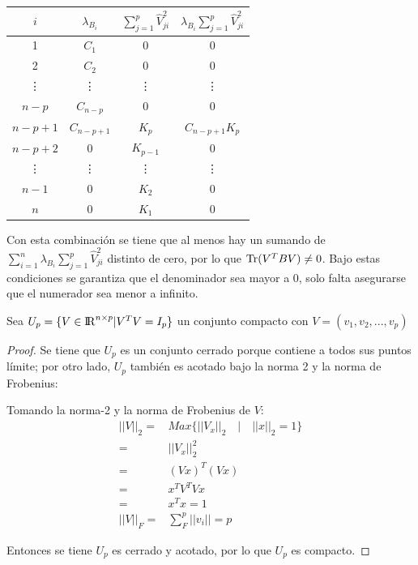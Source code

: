 \begin{center}
\begin{tabular}{ | c | c|  c | c|} 
\hline
$i$ & $\lambda_{B_i}$ & $\sum \limits_{j=1}^{p} \widehat{V}_{ji}^2$  & $\lambda_{B_i} \sum \limits_{j=1}^{p} \widehat{V}_{ji}^2$ \\ 
\hline
\hline
1 & $C_1$ & $0$ & $0$ \\ 
\hline
2 & $C_2$ & $0$ & $0$ \\ 
\hline
\vdots & \vdots & \vdots & \vdots \\ 
\hline
$n-p$ & $C_{n-p}$ & $0$ &  $0$\\ 
\hline
$n-p+1$ & $C_{n-p+1}$ & $K_{p}$ &  $C_{n-p+1} K_{p}$\\ 
\hline
$n-p+2$ & $0$ & $K_{p-1}$  & $0$ \\ 
\hline
\vdots & \vdots & \vdots & \vdots  \\ 
\hline
$n-1$ & $0$ & $K_2$ & $0$ \\ 
\hline
$n$ & $0$ & $K_1$ & $0$ \\ 
\hline
\hline

\end{tabular}
\end{center}

Con esta combinación se tiene que al menos hay un sumando de $\sum\limits_{i=1}^{n} \lambda_{B_i} \sum \limits_{j=1}^{p} \widehat{V}_{ji}^2 $ distinto de cero, por lo que $\operatorname{Tr}(V^T B V) \neq 0$. Bajo estas condiciones se garantiza que el denominador sea mayor a 0, solo falta asegurarse que el numerador sea menor a infinito.

\begin{lemma}
Sea $U_p = \{ V \in {\rm I\!R}^{n \times p} | V^T V = I_p \} $ un conjunto compacto con $V = (v_1, v_2, ... , v_p)$
\end{lemma}
\begin{proof}
Se tiene que $U_p$ es un conjunto cerrado porque contiene a todos sus puntos límite; por otro lado, $U_p$ también es acotado bajo la norma 2 y la norma de Frobenius:

Tomando la norma-2 y la norma de Frobenius de $V$: 
\begin{equation*}
\begin{aligned}
	||V||_2 =& Max \{||V_x ||_2 \quad | \quad ||x||_2 = 1 \} \\
		    =& ||V_x||^2_2  \\
		    =& (Vx)^T (Vx) \\
		    =& x^T V^T V x\\
		    =& x^T x = 1\\
	||V||_F	=& \sum\limits_{F}^{p} ||v_i|| = p   
\end{aligned}
\end{equation*}

Entonces se tiene $U_p$ es cerrado y acotado, por lo que $U_p$ es compacto.
\end{proof}

